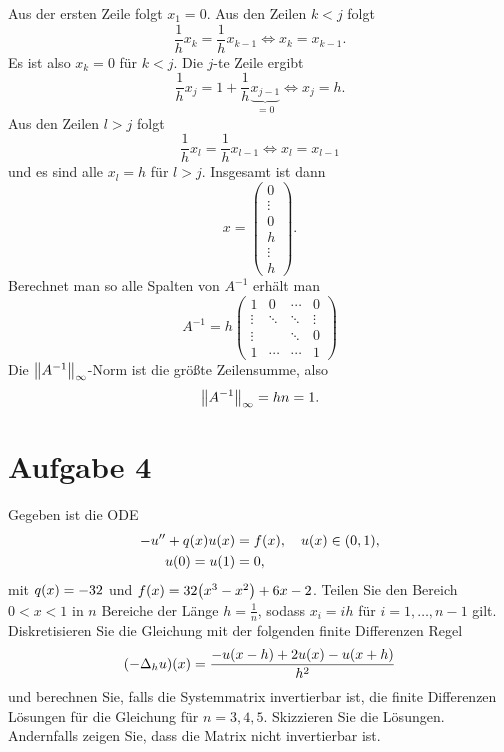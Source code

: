 \documentclass{exercise}
\begin{document}
    Aus der ersten Zeile folgt \(x_1 = 0\).
    Aus den Zeilen \(k < j\) folgt
    \[
        \frac{1}{h}x_k = \frac{1}{h}x_{k - 1} \iff x_k = x_{k - 1}.
    \]
    Es ist also \(x_k = 0\) für \(k < j\).
    Die \(j\)-te Zeile ergibt
    \[
        \frac{1}{h}x_j = 1 + \frac{1}{h}\underbrace{x_{j - 1}}_{= 0} \iff x_j = h.
    \]
    Aus den Zeilen \(l > j\) folgt
    \[
        \frac{1}{h}x_l = \frac{1}{h}x_{l - 1} \iff x_l = x_{l - 1}
    \]
    und es sind alle \(x_l = h\) für \(l > j\).
    Insgesamt ist dann
    \[
        x = \begin{pmatrix}
            0\\\vdots\\0\\h\\\vdots\\h
        \end{pmatrix}.
    \]
    Berechnet man so alle Spalten von \(A^{-1}\) erhält man
    \[
        A^{-1} = h\begin{pmatrix}
            1 & 0 & \cdots & 0\\
            \vdots & \ddots & \ddots & \vdots\\
            \vdots & & \ddots & 0\\
            1 & \cdots & \cdots & 1
        \end{pmatrix}
    \]
    Die \(\norm*{A^{-1}}_\infty\)-Norm ist die größte Zeilensumme, also
    \[
        \norm*{A^{-1}}_\infty = hn = 1.
    \]


    \section*{Aufgabe 4}

    \begin{problem}
        Gegeben ist die ODE
        \begin{align*}
            -u'' + q\parentheses*{x}u\parentheses*{x} &= f\parentheses*{x}, \quad u\parentheses*{x} \in \parentheses*{0, 1},\\
            u\parentheses*{0} = u\parentheses*{1} &= 0,
        \end{align*}
        mit \(q\parentheses*{x} = -32\) und \(f\parentheses*{x} = 32\parentheses*{x^3 - x^2} + 6x - 2\).
        Teilen Sie den Bereich \(0 < x < 1\) in \(n\) Bereiche der Länge \(h = \frac{1}{n}\), sodass \(x_i = ih\) für \(i = 1, \ldots, n - 1\) gilt.
        Diskretisieren Sie die Gleichung mit der folgenden finite Differenzen Regel
        \[
            \parentheses*{-\Delta_h u}\parentheses*{x} = \frac{-u\parentheses*{x - h} + 2u\parentheses*{x} - u\parentheses*{x + h}}{h^2}
        \]
        und berechnen Sie, falls die Systemmatrix invertierbar ist, die finite Differenzen Lösungen für die Gleichung für \(n = 3, 4, 5\).
        Skizzieren Sie die Lösungen.
        Andernfalls zeigen Sie, dass die Matrix nicht invertierbar ist.
    \end{problem}
\end{document}
